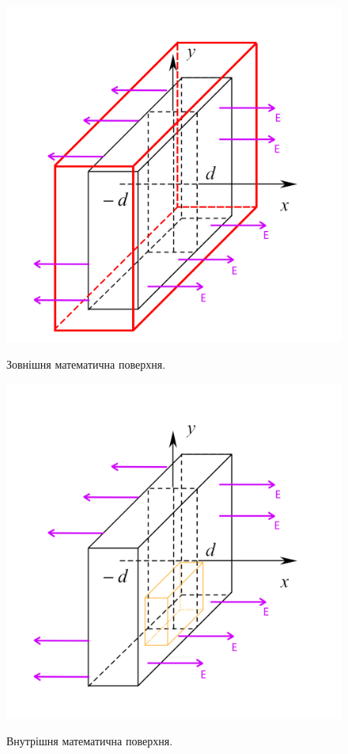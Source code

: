 \documentclass[a4paper,12pt]{article}
\begin{document}
	\begin{figure}[h!]
		\begin{minipage}[h]{0.5\linewidth}
			\includegraphics[width=1\linewidth]{Prt sc/big_1.jpg}
			\label{Figure_1_1}
			\caption{Зовнішня математична поверхня.}
		\end{minipage}
		\begin{minipage}[h]{0.5\linewidth}
			\includegraphics[width=1\linewidth]{Prt sc/small_2.jpg}
			\label{Figure_1_2}
			\caption{Внутрішня математична поверхня.}
		\end{minipage}
	\end{figure}
\end{document}
